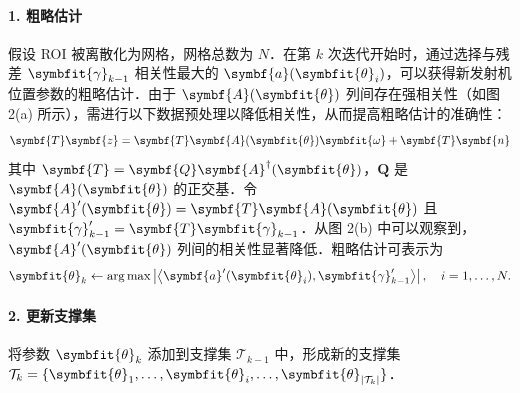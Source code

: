 \documentclass[a4paper,zihao=-4]{ctexart}
\renewcommand{\mathbf}[1]{\symbf{#1}}
\renewcommand{\boldsymbol}[1]{\symbfit{#1}}
\begin{document}
\paragraph{1. 粗略估计}
假设 ROI 被离散化为网格，网格总数为 $N$．在第 $k$ 次迭代开始时，通过选择与残差 $\boldsymbol{\gamma}_{k-1}$ 相关性最大的 $\mathbf{a}(\boldsymbol{\theta}_i)$，可以获得新发射机位置参数的粗略估计．由于 $\mathbf{A}(\boldsymbol{\theta})$ 列间存在强相关性（如图 2(a) 所示），需进行以下数据预处理以降低相关性，从而提高粗略估计的准确性：
\begin{equation}
    \label{eq:preprocessed_model}
    \mathbf{T}\mathbf{z} = \mathbf{T}\mathbf{A}(\boldsymbol{\theta})\boldsymbol{\omega} + \mathbf{T}\mathbf{n}
\end{equation}
其中 $\mathbf{T} = \mathbf{Q}\mathbf{A}^{\dagger}(\boldsymbol{\theta})$，$\mathbf{Q}$ 是 $\mathbf{A}(\boldsymbol{\theta})$ 的正交基．令 $\mathbf{A}'(\boldsymbol{\theta}) = \mathbf{T}\mathbf{A}(\boldsymbol{\theta})$ 且 $\boldsymbol{\gamma}_{k-1}' = \mathbf{T}\boldsymbol{\gamma}_{k-1}$．从图 2(b) 中可以观察到，$\mathbf{A}'(\boldsymbol{\theta})$ 列间的相关性显著降低．粗略估计可表示为
\begin{equation}
    \label{eq:rough_estimation}
    \boldsymbol{\theta}_k \leftarrow \arg\max \left| \left\langle \mathbf{a}'(\boldsymbol{\theta}_i), \boldsymbol{\gamma}_{k-1}' \right\rangle \right|, \quad i = 1, \dots, N.
\end{equation}
\paragraph{2. 更新支撑集}
将参数 $\boldsymbol{\theta}_k$ 添加到支撑集 $\mathcal{T}_{k-1}$ 中，形成新的支撑集 $\mathcal{T}_k = \{ \boldsymbol{\theta}_1, \ldots, \boldsymbol{\theta}_i, \ldots, \boldsymbol{\theta}_{|\mathcal{T}_k|} \}$．
\end{document}
